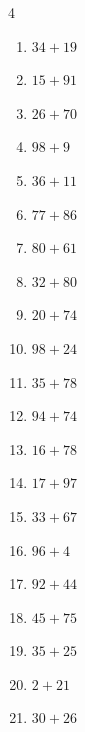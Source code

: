 \begin{multicols}{4}
\begin{enumerate}
  \item $34+19$
        \phantom{$=53$}

  \item $15+91$
        \phantom{$=106$}

  \item $26+70$
        \phantom{$=96$}

  \item $98+9$
        \phantom{$=107$}

  \item $36+11$
        \phantom{$=47$}

  \item $77+86$
        \phantom{$=163$}

  \item $80+61$
        \phantom{$=141$}

  \item $32+80$
        \phantom{$=112$}

  \item $20+74$
        \phantom{$=94$}

  \item $98+24$
        \phantom{$=122$}

  \item $35+78$
        \phantom{$=113$}

  \item $94+74$
        \phantom{$=168$}

  \item $16+78$
        \phantom{$=94$}

  \item $17+97$
        \phantom{$=114$}

  \item $33+67$
        \phantom{$=100$}

  \item $96+4$
        \phantom{$=100$}

  \item $92+44$
        \phantom{$=136$}

  \item $45+75$
        \phantom{$=120$}

\columnbreak %

\resetques

  \item $35+25$
        \phantom{$=60$}

  \item $2+21$
        \phantom{$=23$}

  \item $30+26$
        \phantom{$=56$}


\end{enumerate}
\end{multicols}

